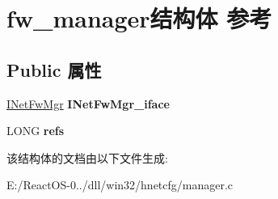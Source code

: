\hypertarget{structfw__manager}{}\section{fw\+\_\+manager结构体 参考}
\label{structfw__manager}
\subsection*{Public 属性}
\begin{DoxyCompactItemize}
\item 
\mbox{\label{structfw__manager_aab5252caec579dae20ad43c70ebf5ce3}} 
\hyperlink{interface_i_net_fw_mgr}{I\+Net\+Fw\+Mgr} {\bfseries I\+Net\+Fw\+Mgr\+\_\+iface}
\item 
\mbox{\label{structfw__manager_aa995c66837d3a6da82b86e548a51a4ec}} 
L\+O\+NG {\bfseries refs}
\end{DoxyCompactItemize}


该结构体的文档由以下文件生成\+:\begin{DoxyCompactItemize}
\item 
E\+:/\+React\+O\+S-\/0../dll/win32/hnetcfg/manager.\+c\end{DoxyCompactItemize}
